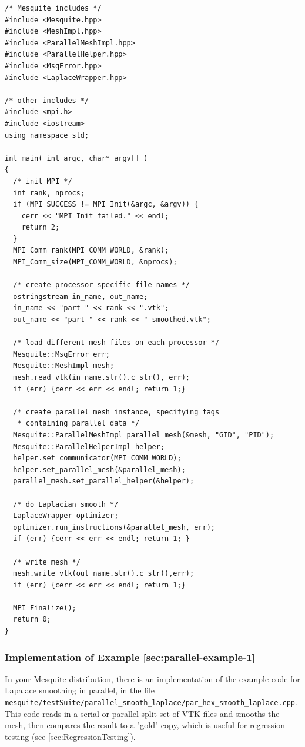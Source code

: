 \begin{verbatim}
/* Mesquite includes */
#include <Mesquite.hpp>
#include <MeshImpl.hpp>
#include <ParallelMeshImpl.hpp>
#include <ParallelHelper.hpp>
#include <MsqError.hpp>
#include <LaplaceWrapper.hpp>

/* other includes */
#include <mpi.h>
#include <iostream>
using namespace std;
  
int main( int argc, char* argv[] )
{
  /* init MPI */
  int rank, nprocs;
  if (MPI_SUCCESS != MPI_Init(&argc, &argv)) {
    cerr << "MPI_Init failed." << endl;
    return 2;
  }
  MPI_Comm_rank(MPI_COMM_WORLD, &rank);
  MPI_Comm_size(MPI_COMM_WORLD, &nprocs);

  /* create processor-specific file names */
  ostringstream in_name, out_name;
  in_name << "part-" << rank << ".vtk";
  out_name << "part-" << rank << "-smoothed.vtk";

  /* load different mesh files on each processor */
  Mesquite::MsqError err;
  Mesquite::MeshImpl mesh;
  mesh.read_vtk(in_name.str().c_str(), err);
  if (err) {cerr << err << endl; return 1;}

  /* create parallel mesh instance, specifying tags 
   * containing parallel data */
  Mesquite::ParallelMeshImpl parallel_mesh(&mesh, "GID", "PID");
  Mesquite::ParallelHelperImpl helper;
  helper.set_communicator(MPI_COMM_WORLD);
  helper.set_parallel_mesh(&parallel_mesh);
  parallel_mesh.set_parallel_helper(&helper);

  /* do Laplacian smooth */
  LaplaceWrapper optimizer;
  optimizer.run_instructions(&parallel_mesh, err);
  if (err) {cerr << err << endl; return 1; }

  /* write mesh */
  mesh.write_vtk(out_name.str().c_str(),err);
  if (err) {cerr << err << endl; return 1;}

  MPI_Finalize();
  return 0;
}
\end{verbatim}

\subsubsection{Implementation of Example \ref{sec:parallel-example-1} }

In your Mesquite distribution, there is an implementation of the
example code for Lapalace smoothing in parallel, in the file
\texttt{mesquite/testSuite/parallel\_smooth\_laplace/par\_hex\_smooth\_laplace.cpp}.
This code reads in a serial or parallel-split set of VTK files and
smooths the mesh, then compares the result to a "gold" copy, which is
useful for regression testing (see \ref{sec:RegressionTesting}).

